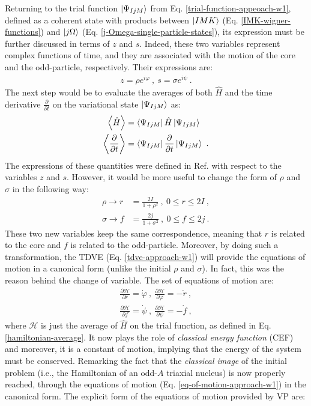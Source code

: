 Returning to the trial function $\ket{\Psi_{IjM}}$ from Eq. \ref{trial-function-appeoach-w1}, defined as a coherent state with products between  $\ket{IMK}$ (Eq. \ref{IMK-wigner-functions}) and $\ket{j\Omega}$ (Eq. \ref{j-Omega-single-particle-states}), its expression must be further discussed in terms of $z$ and $s$. Indeed, these two variables represent complex functions of time, and they are associated with the motion of the core and the odd-particle, respectively. Their expressions are:
\begin{align}
    z=\rho e^{i\varphi}\ ,\ s=\sigma e^{i\psi}\ .
\end{align}
The next step would be to evaluate the averages of both $\hat{H}$ and the time derivative $\frac{\partial}{\partial t}$ on the variational state $\ket{\Psi_{IjM}}$ as:
\begin{align}
    \left\langle \hat{H} \right\rangle&=\bra{\Psi_{IjM}}\hat{H}\ket{\Psi_{IjM}}\nonumber\\
    \left\langle \frac{\partial}{\partial t} \right\rangle&=\bra{\Psi_{IjM}}\frac{\partial}{\partial t}\ket{\Psi_{IjM}}\ .
    \label{hamiltonian-average}
\end{align}
The expressions of these quantities were defined in Ref. \cite{raduta2017semiclassical} with respect to the variables $z$ and $s$. However, it would be more useful to change the form of $\rho$ and $\sigma$ in the following way:
\begin{align}
    \rho \to r&=\frac{2I}{1+\rho^2}\ ,\ 0\leq r\leq 2I\ ,\nonumber\\
    \sigma \to f&=\frac{2j}{1+\sigma^2}\ ,\ 0\leq f\leq 2j\ .
    \label{changed-rho-sigma-variables}
\end{align}
These two new variables keep the same correspondence, meaning that $r$ is related to the core and $f$ is related to the odd-particle. Moreover, by doing such a transformation, the TDVE (Eq. \ref{tdve-approach-w1}) will provide the equations of motion in a canonical form (unlike the initial $\rho$ and $\sigma$). In fact, this was the reason behind the change of variable. The set of equations of motion are:
\begin{align}
    \frac{\partial \mathcal{H}}{\partial r}=\dot{\varphi}\ ,\ \frac{\partial \mathcal{H}}{\partial \varphi}=-\dot{r}\ ,\nonumber\\
    \frac{\partial \mathcal{H}}{\partial f}=\dot{\psi}\ ,\ \frac{\partial \mathcal{H}}{\partial \psi}=-\dot{f}\ ,
    \label{eq-of-motion-approach-w1}
\end{align}
where $\mathcal{H}$ is just the average of $\hat{H}$ on the trial function, as defined in Eq. \ref{hamiltonian-average}. It now plays the role of \emph{classical energy function} (CEF) and moreover, it is a constant of motion, implying that the energy of the system must be conserved. Remarking the fact that the \emph{classical image} of the initial problem (i.e., the Hamiltonian of an odd-$A$ triaxial nucleus) is now properly reached, through the equations of motion (Eq. \ref{eq-of-motion-approach-w1}) in the canonical form. The explicit form of the equations of motion provided by VP are:
